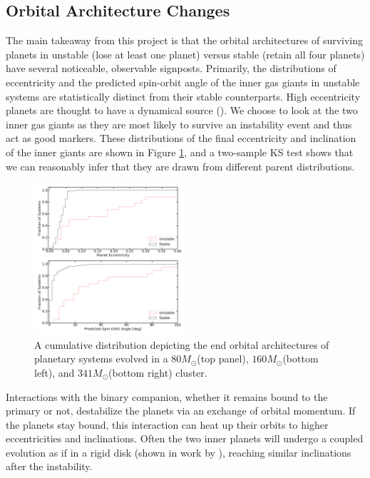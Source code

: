 \documentclass[manuscript]{aastex631}
\begin{document}
\subsection{Orbital Architecture Changes}
The main takeaway from this project is that the orbital architectures of surviving planets in unstable (lose at least one planet)
 versus stable (retain all four planets) have several noticeable, observable signposts. 
 Primarily, the distributions of eccentricity and the predicted spin-orbit angle of the inner gas giants in 
 unstable systems are statistically distinct from their stable counterparts. High eccentricity planets are thought to have a dynamical source (\cite{dlfm97}).
  We choose to look at the 
 two inner gas giants as they are most likely to survive an instability event and thus act as good markers.
These distributions of the final eccentricity and inclination of the inner giants are shown in Figure \ref{fig:160_ecc_inc}, 
 and a two-sample KS test shows that we can reasonably infer that they are drawn from different parent distributions. 
\begin{figure}[h!]
    \centering
    \includegraphics[width=0.5\textwidth]{fig/cumulative_ecc_inc_bigfont80.png}
    
    \caption{A cumulative distribution depicting the end orbital architectures of planetary systems evolved in a $80M_{\odot}$(top panel), $160M_{\odot}$(bottom left), 
    and $341M_{\odot}$(bottom right) cluster.}
    \label{fig:160_ecc_inc}
\end{figure}
Interactions with the binary companion, whether it remains bound to the primary or not, destabilize the planets via an exchange of orbital 
momentum. If the planets stay bound, this interaction can heat up their orbits to higher eccentricities and inclinations. Often the two
inner planets will undergo a coupled evolution as if in a rigid disk (shown in work by \cite{ina97}), reaching similar inclinations after the instability. 
\end{document}
